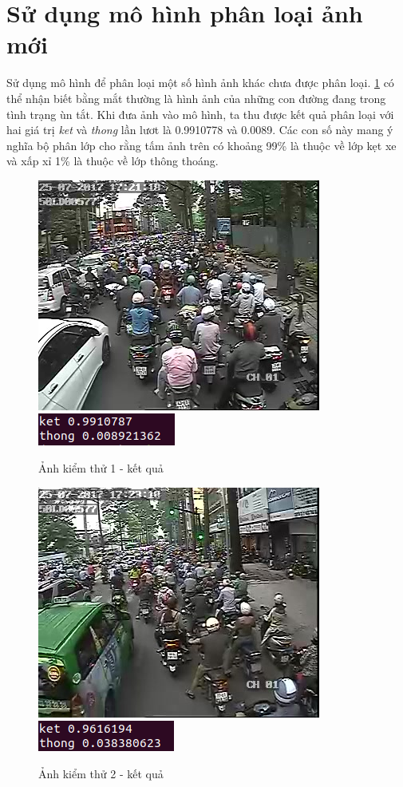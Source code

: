 \section{Sử dụng mô hình phân loại ảnh mới}
	Sử dụng mô hình để phân loại một số hình ảnh khác chưa được phân loại. \ref{fig:test1} có thể nhận biết bằng mắt thường là hình ảnh của những con đường đang trong tình trạng ùn tắt. Khi đưa ảnh vào mô hình, ta thu được kết quả phân loại với hai giá trị \textit{ket} và \textit{thong} lần lươt là 0.9910778 và 0.0089. Các con số này mang ý nghĩa bộ phân lớp cho rằng tấm ảnh trên có  khoảng 99\% là thuộc về lớp kẹt xe và xấp xỉ 1\% là thuộc về lớp thông thoáng.\par 
	\pagebreak	
	\begin{figure}[h!]
		\centering
		\includegraphics[scale=1]{charts/test-ket.jpg}
		\includegraphics[scale=0.5]{charts/test-ket-res.png}
		\caption{Ảnh kiểm thử 1 - kết quả}
		\label{fig:test1}
	\end{figure}
	
	\begin{figure}[h!]
		\centering
		\includegraphics[scale=1]{charts/test-ket1.jpg}
		\includegraphics[scale=0.5]{charts/test-ket1-res.png}
		\caption{Ảnh kiểm thử 2 - kết quả}
		\label{fig:test2}
	\end{figure}
	
